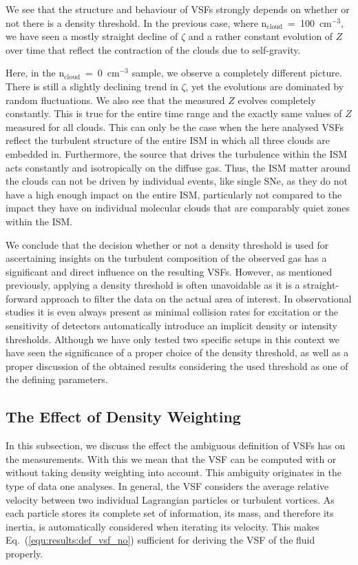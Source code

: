 We see that the structure and behaviour of VSFs strongly depends on whether or not there is a density threshold. 
In the previous case, where n$_\mathrm{cloud}$~=~100~cm$^{-3}$, we have seen a mostly straight decline of $\zeta$ and a rather constant evolution of $Z$ over time that reflect the contraction of the clouds due to self-gravity.

Here, in the n$_\mathrm{cloud}$~=~0~cm$^{-3}$ sample, we observe a completely different picture.
There is still a slightly declining trend in $\zeta$, yet the evolutions are dominated by random fluctuations.
We also see that the measured $Z$ evolves completely constantly.
This is true for the entire time range and the exactly same values of $Z$ measured for all clouds.
This can only be the case when the here analysed VSFs reflect the turbulent structure of the entire ISM in which all three clouds are embedded in.
Furthermore, the source that drives the turbulence within the ISM acts constantly and isotropically on the diffuse gas.
Thus, the ISM matter around the clouds can not be driven by individual events, like single SNe, as they do not have a high enough impact on the entire ISM, particularly not compared to the impact they have on individual molecular clouds that are comparably quiet zones within the ISM.

We conclude that the decision whether or not a density threshold is used for ascertaining insights on the turbulent composition of the observed gas has a significant and direct influence on the resulting VSFs.
However, as mentioned previously, applying a density threshold is often unavoidable as it is a straight-forward approach to filter the data on the actual area of interest.
In observational studies it is even always present as minimal collision rates for excitation or the sensitivity of detectors automatically introduce an implicit density or intensity thresholds. 
Although we have only tested two specific setups in this context we have seen the significance of a proper choice of the density threshold, as well as a proper discussion of the obtained results considering the used threshold as one of the defining parameters.



\subsection{The Effect of Density Weighting}\label{discussion:densweight}

In this subsection, we discuss the effect the ambiguous definition of VSFs has on the measurements. 
With this we mean that the VSF can be computed with or without taking density weighting into account.
This ambiguity originates in the type of data one analyses.
In general, the VSF considers the average relative velocity between two individual Lagrangian particles or turbulent vortices.
As each particle stores its complete set of information, its mass, and therefore its inertia, is automatically considered when iterating its velocity.
This makes Eq.~(\ref{equ:results:def_vsf_no}) sufficient for deriving the VSF of the fluid properly.

